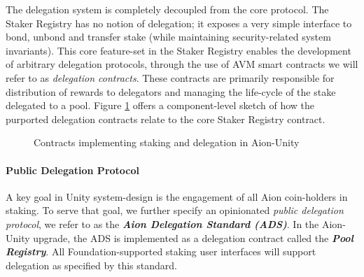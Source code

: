 The delegation system is completely decoupled from the core protocol. The Staker Registry has no notion of delegation; it exposes a very simple interface to bond, unbond and transfer stake (while maintaining security-related system invariants). This core feature-set in the Staker Registry enables the development of arbitrary delegation protocols, through the use of AVM smart contracts we will refer to as \textit{delegation contracts}. These contracts are primarily responsible for distribution of rewards to delegators and managing the life-cycle of the stake delegated to a pool. Figure \ref{fig:delegation_scheme} offers a component-level sketch of how the purported delegation contracts relate to the core Staker Registry contract. 

\begin{figure}[ht]
\centering
{}
\caption{Contracts implementing staking and delegation in Aion-Unity}
\label{fig:delegation_scheme}
\end{figure}

\paragraph*{Public Delegation Protocol}
A key goal in Unity system-design is the engagement of all Aion coin-holders in staking. To serve that goal, we further specify an opinionated \textit{public delegation protocol}, we refer to as the \textbf{\textit{Aion Delegation Standard (ADS)}}. In the Aion-Unity upgrade, the ADS is implemented as a delegation contract called the \textbf{\textit{Pool Registry}}. All Foundation-supported staking user interfaces will support delegation as specified by this standard. 

